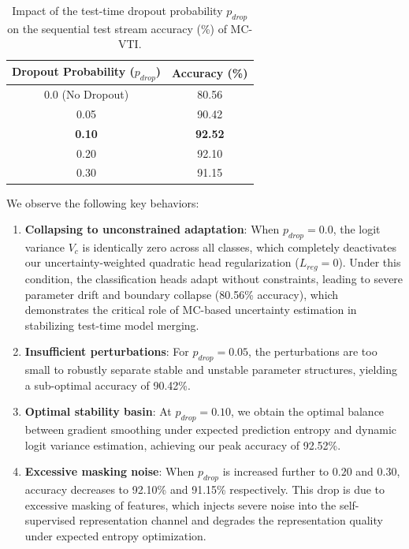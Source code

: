 \documentclass{article}
\theoremstyle{plain}
\theoremstyle{definition}
\theoremstyle{remark}
\begin{document}
\begin{table}[ht]
  \caption{Impact of the test-time dropout probability $p_{drop}$ on the sequential test stream accuracy (\%) of MC-VTI.}
  \label{tab:ablation_dropout}
  \vskip 0.15in
  \begin{center}
  \begin{small}
  \begin{sc}
  \begin{tabular}{cc}
    \toprule
    Dropout Probability ($p_{drop}$) & Accuracy (\%) \\
    \midrule
    0.0 (No Dropout) & 80.56 \\
    0.05             & 90.42 \\
    \textbf{0.10}    & \textbf{92.52} \\
    0.20             & 92.10 \\
    0.30             & 91.15 \\
    \bottomrule
  \end{tabular}
  \end{sc}
  \end{small}
  \end{center}
  \vskip -0.1in
\end{table}

We observe the following key behaviors:
\begin{enumerate}
  \item \textbf{Collapsing to unconstrained adaptation}: When $p_{drop}=0.0$, the logit variance $V_c$ is identically zero across all classes, which completely deactivates our uncertainty-weighted quadratic head regularization ($L_{reg} = 0$). Under this condition, the classification heads adapt without constraints, leading to severe parameter drift and boundary collapse (80.56\% accuracy), which demonstrates the critical role of MC-based uncertainty estimation in stabilizing test-time model merging.
  \item \textbf{Insufficient perturbations}: For $p_{drop}=0.05$, the perturbations are too small to robustly separate stable and unstable parameter structures, yielding a sub-optimal accuracy of 90.42\%.
  \item \textbf{Optimal stability basin}: At $p_{drop}=0.10$, we obtain the optimal balance between gradient smoothing under expected prediction entropy and dynamic logit variance estimation, achieving our peak accuracy of 92.52\%.
  \item \textbf{Excessive masking noise}: When $p_{drop}$ is increased further to $0.20$ and $0.30$, accuracy decreases to 92.10\% and 91.15\% respectively. This drop is due to excessive masking of features, which injects severe noise into the self-supervised representation channel and degrades the representation quality under expected entropy optimization.
\end{enumerate}
\end{document}
